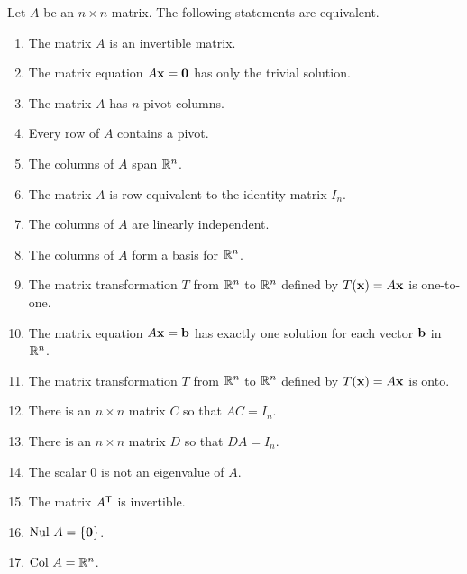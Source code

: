 \begin{theorem} Let $A$ be an $n \times n$ matrix. The following statements are equivalent.
\begin{enumerate}
\item The matrix $A$ is an invertible matrix.
\item \label{item:3_b_trivial_soln} The matrix equation $A \mathbf{x} = \mathbf{0}$ has only the trivial solution.
\item The matrix $A$ has $n$ pivot columns.
\item Every row of $A$ contains a pivot. 
\item The columns of $A$ span $\mathbb{R}^n$.
\item The matrix $A$ is row equivalent to the identity matrix $I_n$.
\item The columns of $A$ are linearly independent.
\item The columns of $A$ form a basis for $\mathbb{R}^n$.
\item The matrix transformation $T$ from $\mathbb{R}^n$ to $\mathbb{R}^n$ defined by $T(\mathbf{x}) = A\mathbf{x}$ is one-to-one.
\item The matrix equation $A \mathbf{x} = \mathbf{b}$ has exactly one solution for each vector $\mathbf{b}$ in $\mathbb{R}^n$.
\item The matrix transformation $T$ from $\mathbb{R}^n$ to $\mathbb{R}^n$ defined by $T(\mathbf{x}) = A\mathbf{x}$ is onto.
\item \label{item:3_b_AC_I} There is an $n \times n$ matrix $C$ so that $AC = I_n$.
\item \label{item:3_b_DA_I} There is an $n \times n$ matrix $D$ so that $DA = I_n$.
\item The scalar 0 is not an eigenvalue of $A$.
\item The matrix $A^{\mathsf{T}}$ is invertible.
\item $\text{Nul } A = \{\mathbf{0}\}$.
\item $\text{Col } A = \mathbb{R}^n$.
\end{enumerate}
\end{theorem}



\ExampleIntro

